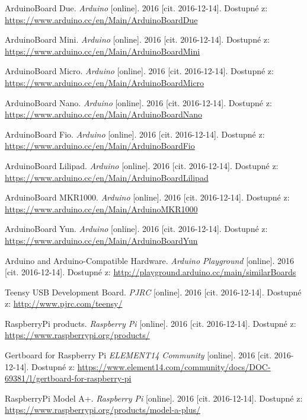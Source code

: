 \begin{literatura}{99}
 ArduinoBoard Due. \textit{Arduino} [online]. 2016 [cit. 2016-12-14]. Dostupné z: \url{https://www.arduino.cc/en/Main/ArduinoBoardDue}

 ArduinoBoard Mini. \textit{Arduino} [online]. 2016 [cit. 2016-12-14]. Dostupné z: \url{https://www.arduino.cc/en/Main/ArduinoBoardMini}

 ArduinoBoard Micro. \textit{Arduino} [online]. 2016 [cit. 2016-12-14]. Dostupné z: \url{https://www.arduino.cc/en/Main/ArduinoBoardMicro}

 ArduinoBoard Nano. \textit{Arduino} [online]. 2016 [cit. 2016-12-14]. Dostupné z: \url{https://www.arduino.cc/en/Main/ArduinoBoardNano}

 ArduinoBoard Fio. \textit{Arduino} [online]. 2016 [cit. 2016-12-14]. Dostupné z: \url{https://www.arduino.cc/en/Main/ArduinoBoardFio}

 ArduinoBoard Lilipad. \textit{Arduino} [online]. 2016 [cit. 2016-12-14]. Dostupné z: \url{https://www.arduino.cc/en/Main/ArduinoBoardLilipad}

 ArduinoBoard MKR1000. \textit{Arduino} [online]. 2016 [cit. 2016-12-14]. Dostupné z: \url{https://www.arduino.cc/en/Main/ArduinoMKR1000}

 ArduinoBoard Yun. \textit{Arduino} [online]. 2016 [cit. 2016-12-14]. Dostupné z: \url{https://www.arduino.cc/en/Main/ArduinoBoardYun}

 Arduino and Arduino-Compatible Hardware. \textit{Arduino Playground} [online]. 2016 [cit. 2016-12-14]. Dostupné z: \url{http://playground.arduino.cc/main/similarBoards}

 Teensy USB Development Board. \textit{PJRC} [online]. 2016 [cit. 2016-12-14]. Dostupné z: \url{http://www.pjrc.com/teensy/}

 RaspberryPi products. \textit{Raspberry Pi} [online]. 2016 [cit. 2016-12-14]. Dostupné z: \url{https://www.raspberrypi.org/products/}

 Gertboard for Raspberry Pi \textit{ELEMENT14 Community} [online]. 2016 [cit. 2016-12-14]. Dostupné z: \url{https://www.element14.com/community/docs/DOC-69381/l/gertboard-for-raspberry-pi}

 RaspberryPi Model A+. \textit{Raspberry Pi} [online]. 2016 [cit. 2016-12-14]. Dostupné z: \url{https://www.raspberrypi.org/products/model-a-plus/}


\end{literatura}
